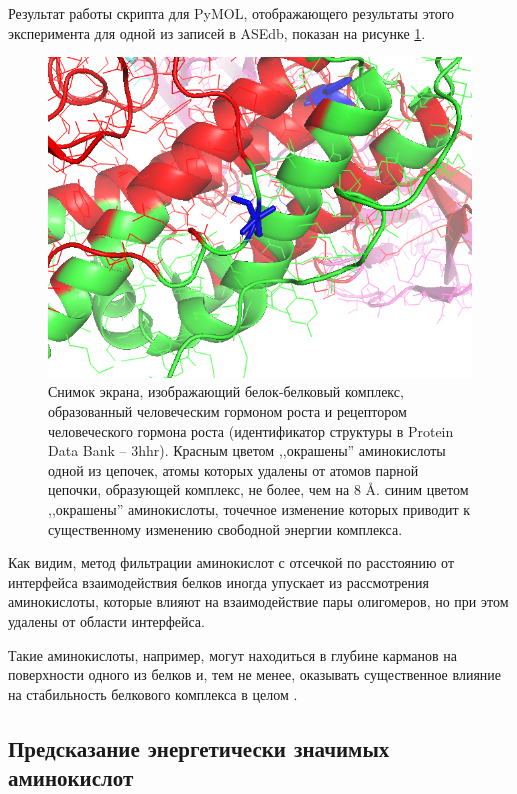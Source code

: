 Результат работы скрипта для PyMOL, отображающего результаты этого эксперимента для одной из записей в ASEdb, показан на  рисунке \ref{fig:image7}.


\begin{figure}
\includegraphics[width=\linewidth]{image7.png}

\caption{\small{Снимок экрана, изображающий
белок-белковый комплекс, образованный  человеческим гормоном роста и рецептором человеческого гормона роста (идентификатор структуры в Protein Data Bank -- 3hhr). Красным цветом ,,окрашены'' аминокислоты одной из цепочек, атомы которых удалены от атомов парной цепочки, образующей  комплекс, не более, чем на 8 \AA{}. синим цветом ,,окрашены'' аминокислоты, точечное изменение которых приводит к существенному изменению свободной энергии комплекса.  }}
\label{fig:image7}
\end{figure}

Как видим, метод фильтрации аминокислот с отсечкой по расстоянию от интерфейса взаимодействия белков иногда упускает из рассмотрения аминокислоты, которые влияют на взаимодействие пары олигомеров, но при этом удалены от области интерфейса.

Такие аминокислоты, например, могут находиться в глубине карманов на поверхности одного из белков и, тем не менее, оказывать существенное влияние на стабильность белкового комплекса в целом \cite{pockets2004}.

\newpage
\subsection{Предсказание энергетически значимых аминокислот}

